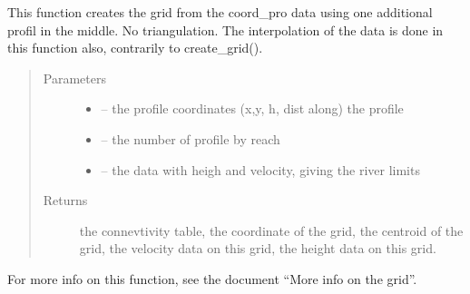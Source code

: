 \documentclass[letterpaper,10pt,english]{sphinxmanual}
\begin{document}
\begin{fulllineitems}
\label{\detokenize{index:src.manage_grid_8.create_grid_only_1_profile}}
This function creates the grid from the coord\_pro data using one additional profil in the middle. No triangulation.
The interpolation of the data is done in this function also, contrarily to create\_grid().
\begin{quote}\begin{description}
\item[{Parameters}] \leavevmode\begin{itemize}
\item {} 
 -- the profile coordinates (x,y, h, dist along) the profile

\item {} 
 -- the number of profile by reach

\item {} 
 -- the data with heigh and velocity, giving the river limits

\end{itemize}

\item[{Returns}] \leavevmode
the connevtivity table, the coordinate of the grid, the centroid of the grid, the velocity data on this
grid, the height data on this grid.

\end{description}\end{quote}

For more info on this function, see the document ``More info on the grid''.

\end{fulllineitems}

\end{document}
